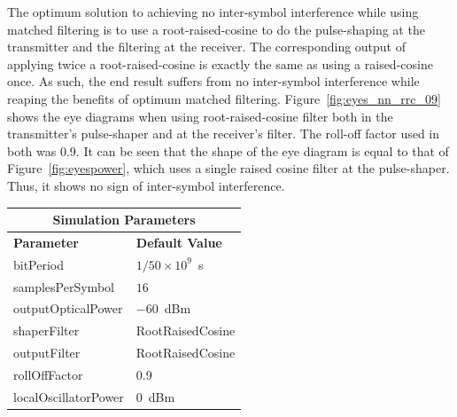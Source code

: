 \begin{refsection}
The optimum solution to achieving no inter-symbol interference while using
matched filtering is to use a root-raised-cosine to do the pulse-shaping at the
transmitter and the filtering at the receiver. The corresponding output of
applying twice a root-raised-cosine is exactly the same as using a
raised-cosine once. As such, the end result suffers from no inter-symbol
interference while reaping the benefits of optimum matched filtering.
Figure~\ref{fig:eyes_nn_rrc_09} shows the eye diagrams when using
root-raised-cosine filter both in the transmitter's pulse-shaper and at the
receiver's filter. The roll-off factor used in both was 0.9. It can be seen
that the shape of the eye diagram is equal to that of
Figure~\ref{fig:eyespower}, which uses a single raised cosine filter at the
pulse-shaper. Thus, it shows no sign of inter-symbol interference.
\begin{table}[H]
	\centering
	\footnotesize
	\begin{tabular}{|l|l|}
		\hline
		\multicolumn{2}{|c|}{ \textbf{Simulation Parameters} } \\
		\hline
		\textbf{Parameter}     & \textbf{Default Value}                                     \\\hline
		bitPeriod              & $1/50\times10^9$~s														\\\hline
		samplesPerSymbol       & $16$                                                       \\\hline
		outputOpticalPower     & $-60$~dBm 													\\ \hline
		shaperFilter	       & RootRaisedCosine												\\ \hline
		outputFilter		   & RootRaisedCosine												\\ \hline
		rollOffFactor		   & 0.9														\\ \hline
		localOscillatorPower   & $0$~dBm                                                    \\ \hline

\end{tabular}
\end{table}
\end{refsection}
